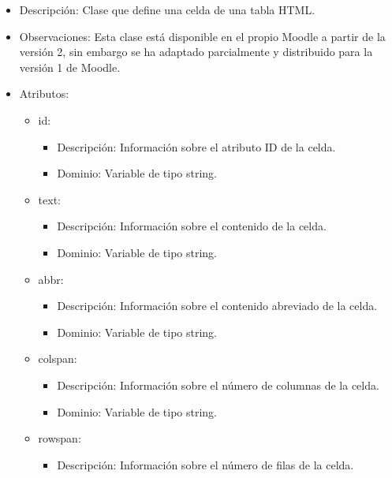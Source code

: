 \begin{itemize}
	\item Descripción: Clase que define una celda de una tabla HTML.
	\item Observaciones: Esta clase está disponible en el propio Moodle a partir de la versión 2, sin embargo se ha adaptado parcialmente y distribuido para la versión 1 de Moodle.
	\item Atributos:
		\begin{itemize}
			\item id:
				\begin{itemize}
					\item Descripción: Información sobre el atributo ID de la celda.
					\item Dominio: Variable de tipo string.
				\end{itemize}
		\end{itemize}
		\begin{itemize}
			\item text:
				\begin{itemize}
					\item Descripción: Información sobre el contenido de la celda.
					\item Dominio: Variable de tipo string.
				\end{itemize}
		\end{itemize}
		\begin{itemize}
			\item abbr:
				\begin{itemize}
					\item Descripción: Información sobre el contenido abreviado de la celda.
					\item Dominio: Variable de tipo string.
				\end{itemize}
		\end{itemize}
		\begin{itemize}
			\item colspan:
				\begin{itemize}
					\item Descripción: Información sobre el número de columnas de la celda.
					\item Dominio: Variable de tipo string.
				\end{itemize}
		\end{itemize}
		\begin{itemize}
			\item rowspan:
				\begin{itemize}
					\item Descripción: Información sobre el número de filas de la celda.

\end{itemize}
\end{itemize}
\end{itemize}
